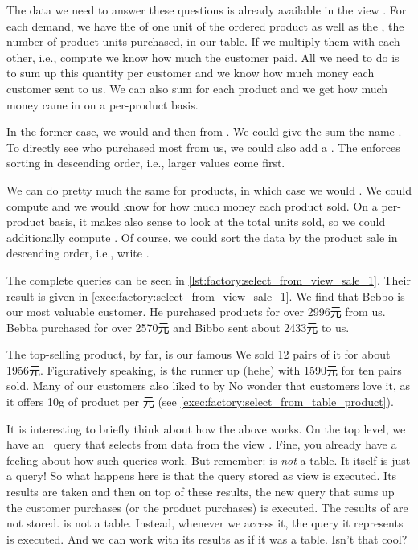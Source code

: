 The data we need to answer these questions is already available in the view .
For each demand, we have the  of one unit of the ordered product as well as the , the number of product units purchased, in our table.
If we multiply them with each other, i.e., compute  we know how much the customer paid.
All we need to do is to sum up this quantity per customer and we know how much money each customer sent to us.
We can also sum  for each product and we get how much money came in on a per-product basis.%
%
\begin{sloppypar}%
In the former case, we would  and then  from .
We could give the sum the name .
To directly see who purchased most from us, we could also add a .
The  enforces sorting in descending order, i.e., larger values come first.%
\end{sloppypar}%
%
We can do pretty much the same for products, in which case we would .
We could compute  and we would know for how much money each product sold.
On a per-product basis, it makes also sense to look at the total units sold, so we could additionally compute .
Of course, we could sort the data by the product sale in descending order, i.e., write .

The complete queries can be seen in \cref{lst:factory:select_from_view_sale_1}.
Their result is given in \cref{exec:factory:select_from_view_sale_1}.
We find that Bebbo is our most valuable customer.
He purchased products for over 2996元 from us.
Bebba purchased for over 2570元 and Bibbo sent about 2433元 to us.

The top-selling product, by far, is our famous 
We sold 12 pairs of it for about 1956元.
Figuratively speaking,  is the runner up (hehe) with 1590元 for ten pairs sold.
Many of our customers also liked to by 
No wonder that customers love it, as it offers 10g of product per 元 (see \cref{exec:factory:select_from_table_product}).

It is interesting to briefly think about how the above works.
On the top level, we have an \sql\ query that selects from data from the view .
Fine, you already have a feeling about how such queries work.
But remember:  is \emph{not} a table.
It itself is just a query!
So what happens here is that the query stored as view  is executed.
Its results are taken and then on top of these results, the new query that sums up the customer purchases (or the product purchases) is executed.
The results of  are not stored.
 is not a table.
Instead, whenever we access it, the query it represents is executed.
And we can work with its results as if it was a table.
Isn't that cool?


